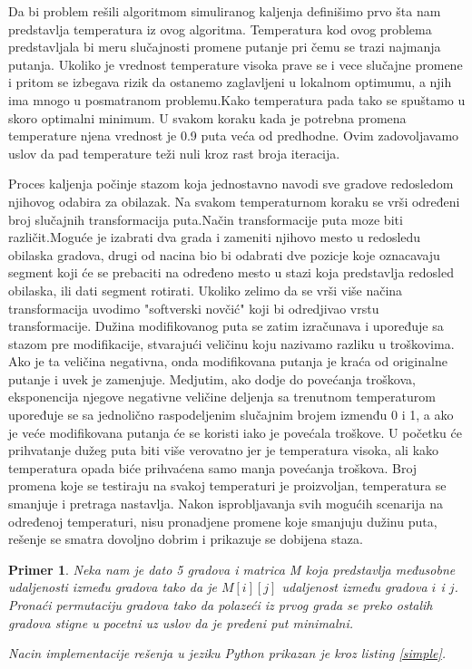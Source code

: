 \documentclass[a4paper]{article}
\newtheorem{primer}{Primer}[section]
\begin{document}
Da bi problem rešili algoritmom simuliranog kaljenja definišimo prvo šta nam predstavlja temperatura iz ovog algoritma. Temperatura kod ovog problema predstavljala bi meru slučajnosti promene putanje pri čemu se trazi najmanja putanja. Ukoliko je vrednost temperature visoka prave se i vece slučajne promene i pritom se izbegava rizik da ostanemo zaglavljeni u lokalnom optimumu, a njih ima mnogo u posmatranom problemu.Kako temperatura pada tako se spuštamo u skoro optimalni minimum. U svakom koraku kada je potrebna promena temperature njena vrednost je 0.9 puta veća od predhodne. Ovim zadovoljavamo uslov da pad temperature teži nuli kroz rast broja iteracija.\par

Proces kaljenja počinje stazom koja jednostavno navodi sve gradove redosledom njihovog odabira za obilazak. Na svakom temperaturnom koraku se vrši određeni broj slučajnih transformacija puta.Način transformacije puta moze biti različit.Moguće je izabrati dva grada i zameniti njihovo mesto u redosledu obilaska gradova, drugi od nacina bio bi odabrati dve pozicje koje oznacavaju segment koji će se prebaciti na određeno mesto u stazi koja predstavlja redosled obilaska, ili dati segment rotirati. Ukoliko zelimo da se vrši više načina transformacija uvodimo "softverski novčić" koji bi odredjivao vrstu transformacije. 
 Dužina modifikovanog puta se zatim izračunava i upoređuje sa stazom pre modifikacije, stvarajući veličinu koju nazivamo razliku u troškovima. Ako je ta veličina negativna, onda modifikovana putanja je kraća od originalne putanje i uvek je zamenjuje. Medjutim, ako dodje do povećanja troškova, eksponencija njegove negativne veličine deljenja sa trenutnom temperaturom upoređuje se sa jednolično raspodeljenim slučajnim brojem izmenđu 0 i 1, a ako je veće modifikovana putanja će se koristi iako je povećala troškove. U početku će prihvatanje dužeg puta biti više verovatno jer je temperatura visoka, ali kako temperatura opada biće prihvaćena samo manja povećanja troškova. Broj promena koje se testiraju na svakoj temperaturi je proizvoljan, temperatura se smanjuje i pretraga nastavlja. Nakon isprobljavanja svih mogućih scenarija na određenoj temperaturi, nisu pronadjene promene koje smanjuju dužinu puta, rešenje se smatra dovoljno dobrim i prikazuje se dobijena staza.

\begin{primer}
Neka nam je dato 5 gradova i matrica M koja predstavlja međusobne udaljenosti između gradova tako da je $M[i][j]$ udaljenost između gradova $i$ i $j$. Pronaći permutaciju gradova tako da polazeći iz prvog grada se preko ostalih gradova stigne u pocetni uz uslov da je pređeni put minimalni.\par
Nacin implementacije rešenja u jeziku Python prikazan je kroz listing \ref{simple}. 
\end{primer}
\end{document}
